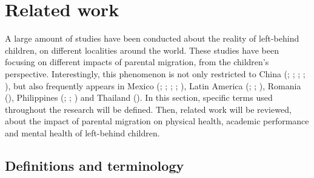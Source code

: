 \section{Related work}
\label{related-work}

A large amount of studies have been conducted about the reality of left-behind children, on different localities around the world. These studies have been focusing on different impacts of parental migration, from the children's perspective. Interestingly, this phenomenon is not only restricted to China (\cite{song2009health}; \cite{he2012depression}; \cite{guo2017effect}; \cite{fan2010emotional}; \cite{bai2017effect}), but also frequently appears in Mexico (\cite{sawyer2016money}; \cite{kanaiaupuni2000reframing}; \cite{hildebrandt2005effects}; \cite{fernandez1998fathers}; \cite{dreby2007children}), Latin America (\cite{mundial2006development}; \cite{acosta2007impact}; \cite{anton2010impact}), Romania (\cite{botezat2014impact}), Philippines (\cite{yang2008international}; \cite{cortes2015feminization}; \cite{arguillas2010impact}) and Thailand (\cite{jampaklay2006parental}). In this section, specific terms used throughout the research will be defined. Then, related work will be reviewed, about the impact of parental migration on physical health, academic performance and mental health of left-behind children. 

\subsection{Definitions and terminology}
\label{subsec:definitions_and_terminology}

